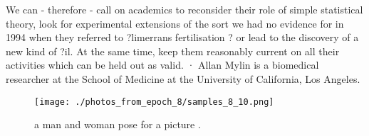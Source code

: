 \documentclass{article}%
\begin{document}
We can {-} therefore {-} call on academics to reconsider their role of simple statistical theory, look for experimental extensions of the sort we had no evidence for in 1994 when they referred to ?limerrans fertilisation ? or lead to the discovery of a new kind of ?il. At the same time, keep them reasonably current on all their activities which can be held out as valid.\newline%
· Allan Mylin is a biomedical researcher at the School of Medicine at the University of California, Los Angeles.\newline%

%


\begin{figure}[h!]%
\centering%
\texttt{[image: ./photos\_from\_epoch\_8/samples\_8\_10.png]}%
\caption{a man and woman pose for a picture .}%
\end{figure}

%
\end{document}
